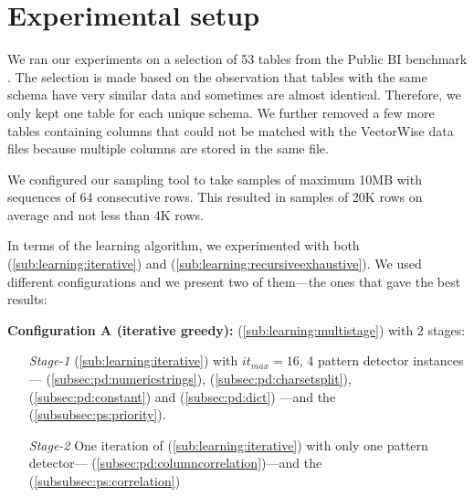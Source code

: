 \section{Experimental setup}
\label{sec:eval:expsetup}


\graphicspath{{6_evaluation/images/}}

% 

We ran our experiments on a selection of 53 tables from the Public BI benchmark \cite{pbib}. The selection is made based on the observation that tables with the same schema have very similar data and sometimes are almost identical. Therefore, we only kept one table for each unique schema. We further removed a few more tables containing columns that could not be matched with the VectorWise data files because multiple columns are stored in the same file.


We configured our sampling tool to take samples of maximum 10MB with sequences of 64 consecutive rows. This resulted in samples of 20K rows on average and not less than 4K rows.

In terms of the learning algorithm, we experimented with both  (\ref{sub:learning:iterative}) and  (\ref{sub:learning:recursiveexhaustive}). We used different configurations and we present two of them---the ones that gave the best results:

\vspace{0.5em}
\noindent\textbf{Configuration A (iterative greedy):}  (\ref{sub:learning:multistage}) with 2 stages:
\begin{enumerate}[nosep]
    \item[\textit{Stage-1}]  (\ref{sub:learning:iterative}) with \(it_{max} = 16\), 4 pattern detector instances---
     (\ref{subsec:pd:numericstrings}), 
     (\ref{subsec:pd:charsetsplit}), 
     (\ref{subsec:pd:constant}) and 
     (\ref{subsec:pd:dict})
    ---and the  (\ref{subsubsec:ps:priority}).
    \item[\textit{Stage-2}] One iteration of  (\ref{sub:learning:iterative}) with only one pattern detector---     (\ref{subsec:pd:columncorrelation})---and the  (\ref{subsubsec:ps:correlation})
\end{enumerate}

